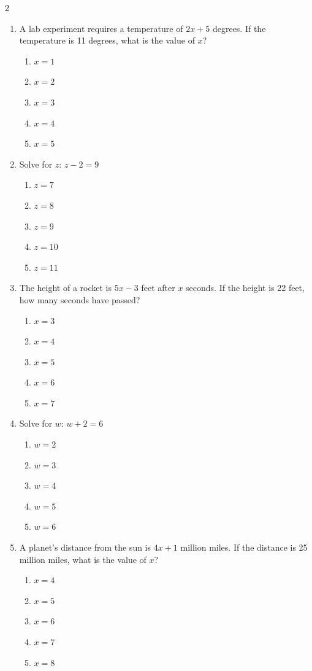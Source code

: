 \documentclass[10pt]{article}
\begin{document}
\begin{multicols}{2}
\begin{enumerate}[label=\textbf{Q\arabic*.}, leftmargin=*, itemsep=6pt, parsep=0pt]
  \item \small A lab experiment requires a temperature of $2x + 5$ degrees. If the temperature is 11 degrees, what is the value of $x$?
  \begin{enumerate}[label=(\Alph*), leftmargin=0.6cm, nosep, itemsep=2pt]
    \item $x = 1$
    \item $x = 2$
    \item $x = 3$
    \item $x = 4$
    \item $x = 5$
  \end{enumerate}

  \item \small Solve for $z$: $z - 2 = 9$
  \begin{enumerate}[label=(\Alph*), leftmargin=0.6cm, nosep, itemsep=2pt]
    \item $z = 7$
    \item $z = 8$
    \item $z = 9$
    \item $z = 10$
    \item $z = 11$
  \end{enumerate}

  \item \small The height of a rocket is $5x - 3$ feet after $x$ seconds. If the height is 22 feet, how many seconds have passed?
  \begin{enumerate}[label=(\Alph*), leftmargin=0.6cm, nosep, itemsep=2pt]
    \item $x = 3$
    \item $x = 4$
    \item $x = 5$
    \item $x = 6$
    \item $x = 7$
  \end{enumerate}

  \item \small Solve for $w$: $w + 2 = 6$
  \begin{enumerate}[label=(\Alph*), leftmargin=0.6cm, nosep, itemsep=2pt]
    \item $w = 2$
    \item $w = 3$
    \item $w = 4$
    \item $w = 5$
    \item $w = 6$
  \end{enumerate}

  \item \small A planet's distance from the sun is $4x + 1$ million miles. If the distance is 25 million miles, what is the value of $x$?
  \begin{enumerate}[label=(\Alph*), leftmargin=0.6cm, nosep, itemsep=2pt]
    \item $x = 4$
    \item $x = 5$
    \item $x = 6$
    \item $x = 7$
    \item $x = 8$
  \end{enumerate}


\end{enumerate}
\end{multicols}
\end{document}
